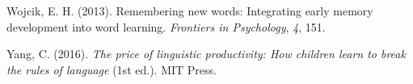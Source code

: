 \documentclass[
  english,
  man,mask,floatsintext]{apa6}
\begin{document}
\leavevmode\hypertarget{ref-wojcik2013remembering}{}%
Wojcik, E. H. (2013). Remembering new words: Integrating early memory development into word learning. \emph{Frontiers in Psychology}, \emph{4}, 151.

\leavevmode\hypertarget{ref-yang2016price}{}%
Yang, C. (2016). \emph{The price of linguistic productivity: How children learn to break the rules of language} (1st ed.). MIT Press.

\endgroup


\end{document}
